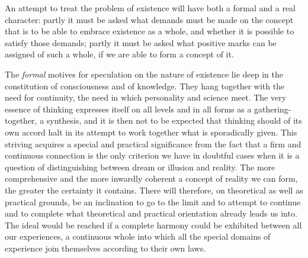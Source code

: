 \documentclass[12pt,a4paper]{book}
\newcommand{\opage}[1]{\marginnote{\footnotesize\textit{[#1]}}}
\begin{document}
An attempt to treat the problem of existence will have both a formal and a real
character: partly it must be asked what demands must be made on the concept that
is to be able to embrace existence as a whole, and whether it is possible to
satisfy those demands; partly it must be asked what positive marks can be
assigned of such a whole, if we are able to form a concept of it.

\opage{54}The \emph{formal} motives for speculation on the nature of existence lie deep in
the constitution of consciousness and of knowledge. They hang together with the
need for continuity, the need in which personality and science meet. The very
essence of thinking expresses itself on all levels and in all forms as a
gathering-together, a synthesis, and it is then not to be expected that thinking
should of its own accord halt in its attempt to work together what is
sporadically given. This striving acquires a special and practical significance
from the fact that a firm and continuous connection is the only criterion we have
in doubtful cases when it is a question of distinguishing between dream or
illusion and reality. The more comprehensive and the more inwardly coherent a
concept of reality we can form, the greater the certainty it contains. There will
therefore, on theoretical as well as practical grounds, be an inclination to go
to the limit and to attempt to continue and to complete what theoretical and
practical orientation already leads us into. The ideal would be reached if a
complete harmony could be exhibited between all our experiences, a continuous
whole into which all the special domains of experience join themselves according
to their own laws.
\end{document}
